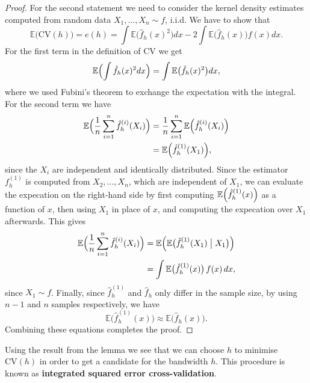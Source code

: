 \documentclass[
  a4paper,
]{article}
\theoremstyle{definition}
\theoremstyle{definition}
\theoremstyle{definition}
\theoremstyle{definition}
\theoremstyle{remark}
\begin{document}
\begin{proof}
For the second statement we need to consider the kernel density estimates
computed from random data \(X_1, \ldots, X_n \sim f\), i.i.d. We have to show
that
\begin{equation*}
  \mathbb{E}\bigl( \mathrm{CV}(h) \bigr)
  = e(h)
  = \int \mathbb{E}\bigl( \hat f_h(x)^2 \bigr) dx - 2 \int \mathbb{E}\bigl( \hat f_h(x) \bigr) f(x) dx.
\end{equation*}
For the first term in the definition of \(\mathrm{CV}\) we get
\begin{equation*}
  \mathbb{E}\Bigl( \int \hat f_h(x)^2 dx \Bigr)
  = \int \mathbb{E}\bigl( \hat f_h(x)^2 \bigr) dx,
\end{equation*}
where we used Fubini's theorem to exchange the expectation with the integral.
For the second term we have
\begin{align*}
  \mathbb{E}\Bigl( \frac{1}{n} \sum_{i=1}^n \hat f_h^{(i)}(X_i) \Bigr)
  &= \frac{1}{n} \sum_{i=1}^n \mathbb{E}\Bigl( \hat f_h^{(i)}(X_i) \Bigr) \\
  &= \mathbb{E}\Bigl( \hat f_h^{(1)}(X_1) \Bigr),
\end{align*}
since the \(X_i\) are independent and identically distributed.
Since the estimator \(f_h^{(1)}\) is computed from \(X_2, \ldots, X_n\),
which are independent of \(X_1\), we can evaluate the expecation on
the right-hand side by first computing \(\mathbb{E}\Bigl( \hat f_h^{(1)}(x) \Bigr)\)
as a function of \(x\), then using \(X_1\) in place of \(x\), and computing
the expecation over \(X_1\) afterwards. This gives
\begin{align*}
  \mathbb{E}\Bigl( \frac{1}{n} \sum_{i=1}^n \hat f_h^{(i)}(X_i) \Bigr)
  &= \mathbb{E}\Bigl( \mathbb{E}\bigl( \hat f_h^{(1)}(X_1) \bigm| X_1 \bigr) \Bigr) \\
  &= \int \mathbb{E}\bigl( \hat f_h^{(1)}(x) \bigr) \, f(x) \, dx,
\end{align*}
since \(X_1 \sim f\). Finally, since \(\hat f_h^{(1)}\) and \(\hat f_h\)
only differ in the sample size, by using \(n-1\) and \(n\) samples respectively,
we have
\begin{equation*}
  \mathbb{E}\bigl( \hat f_h^{(1)}(x) \bigr)
  \approx \mathbb{E}\bigl( \hat f_h(x) \bigr).
\end{equation*}
Combining these equations completes the proof.
\end{proof}

Using the result from the lemma we see that we can choose \(h\)
to minimise \(\mathrm{CV}(h)\) in order to get a candidate for the
bandwidth \(h\). This procedure is known as
\textbf{integrated squared error cross-validation}.
\end{document}
